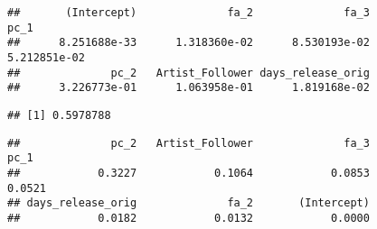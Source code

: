 \documentclass[
]{article}
\newenvironment{Shaded}{\begin{snugshade}}{\end{snugshade}}
\newcommand{\CommentTok}[1]{\textcolor[rgb]{0.56,0.35,0.01}{\textit{#1}}}
\newcommand{\DataTypeTok}[1]{\textcolor[rgb]{0.13,0.29,0.53}{#1}}
\newcommand{\DecValTok}[1]{\textcolor[rgb]{0.00,0.00,0.81}{#1}}
\newcommand{\KeywordTok}[1]{\textcolor[rgb]{0.13,0.29,0.53}{\textbf{#1}}}
\newcommand{\NormalTok}[1]{#1}
\newcommand{\OperatorTok}[1]{\textcolor[rgb]{0.81,0.36,0.00}{\textbf{#1}}}
\begin{document}
\begin{Shaded}
\end{Shaded}

\begin{verbatim}
##       (Intercept)              fa_2              fa_3              pc_1 
##      8.251688e-33      1.318360e-02      8.530193e-02      5.212851e-02 
##              pc_2   Artist_Follower days_release_orig 
##      3.226773e-01      1.063958e-01      1.819168e-02
\end{verbatim}

\begin{Shaded}
\end{Shaded}

\begin{verbatim}
## [1] 0.5978788
\end{verbatim}

\begin{Shaded}
\end{Shaded}

\begin{verbatim}
##              pc_2   Artist_Follower              fa_3              pc_1 
##            0.3227            0.1064            0.0853            0.0521 
## days_release_orig              fa_2       (Intercept) 
##            0.0182            0.0132            0.0000
\end{verbatim}
\end{document}
